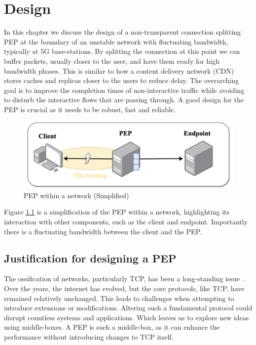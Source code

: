 \documentclass[a4paper,english, 11pt]{report}
\begin{document}
\chapter{Design} %
In this chapter we discuss the design of a non-transparent connection splitting PEP at the boundary of an unstable network with fluctuating bandwidth, typically at 5G base-stations. By splitting the connection at this point we can buffer packets, usually closer to the user, and have them ready for high bandwidth phases. This is similar to how a content delivery network (CDN) stores caches and replicas closer to the users to reduce delay. The overarching goal is to improve the completion times of non-interactive traffic while avoiding to disturb the interactive flows that are passing through. A good design for the PEP is crucial as it needs to be robust, fast and reliable. \\

\begin{figure} %
	\centering
	\includegraphics[scale=0.45]{../diagrams/drawio/simple_pep_design.png}
  	\caption{PEP within a network (Simplified)}
  	\label{fig:simple_pep_design}
\end{figure}

Figure \ref{fig:simple_pep_design} is a simplification of the PEP within a network, highlighting its interaction with other components, such as the client and endpoint. Importantly there is a fluctuating bandwidth between the client and the PEP.

\section{Justification for designing a PEP}
The ossification of networks, particularly TCP, has been a long-standing issue~\cite{tcp_extendable}. Over the years, the internet has evolved, but the core protocols, like TCP, have remained relatively unchanged. This leads to challenges when attempting to introduce extensions or modifications. Altering such a fundamental protocol could disrupt countless systems and applications. Which leaves us to explore new ideas using middle-boxes. A PEP is such a middle-box, as it can enhance the performance without introducing changes to TCP itself.\\
\end{document}
